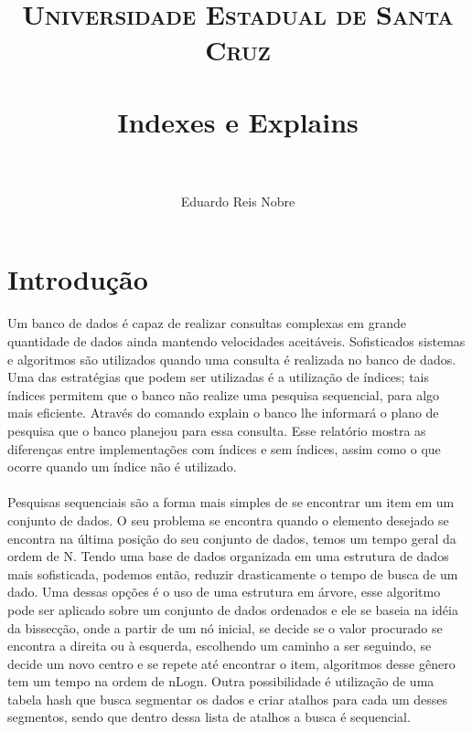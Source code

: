 \documentclass[12pt, a4paper, twoside, titlepage]{article}
\title{
		\normalfont \normalsize \textsc{Universidade Estadual de Santa Cruz} \\ [25pt]
		\horrule{0.5pt} \\[0.4cm]
		\huge Indexes e Explains\\
		\horrule{2pt} \\[0.5cm]
}
\author{
	\normalfont 								\normalsize
	Eduardo Reis Nobre\\[-3pt]		\normalsize
}
\begin{document}
\maketitle



\tableofcontents %
\clearpage

\section{Introdução}
Um banco de dados é capaz de realizar consultas complexas em grande quantidade de dados ainda mantendo velocidades aceitáveis. Sofisticados sistemas e algoritmos são utilizados quando uma consulta é realizada no banco de dados. Uma das estratégias que podem ser utilizadas é a utilização de índices; tais índices permitem que o banco não realize uma pesquisa sequencial, para algo mais eficiente. Através do comando explain o banco lhe informará o plano de pesquisa que o banco planejou para essa consulta. Esse relatório mostra as diferenças entre implementações com índices e sem índices, assim como o que ocorre quando um índice não é utilizado.
\\\\
Pesquisas sequenciais são a forma mais simples de se encontrar um item em um conjunto de dados. O seu problema se encontra quando o elemento desejado se encontra na última posição do seu conjunto de dados, temos um tempo geral da ordem de N. Tendo uma base de dados organizada em uma estrutura de dados mais sofisticada, podemos então, reduzir drasticamente o tempo de busca de um dado. Uma dessas opções é o uso de uma estrutura em árvore, esse algoritmo pode ser aplicado sobre um conjunto de dados ordenados e ele se baseia na idéia da bissecção, onde a partir de um nó inicial, se decide se o valor procurado se encontra a direita ou à esquerda, escolhendo um caminho a ser seguindo, se decide um novo centro e se repete até encontrar o item, algoritmos desse gênero tem um tempo na ordem de nLogn. Outra possibilidade é utilização de uma tabela hash que busca segmentar os dados e criar atalhos para cada um desses segmentos, sendo que dentro dessa lista de atalhos a busca é sequencial.
\end{document}
